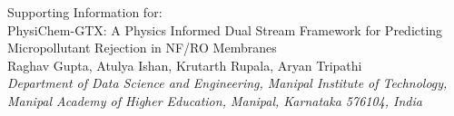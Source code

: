 \documentclass[11pt]{article}
\begin{document}
\begin{center}
    {\Large Supporting Information for:}\\[0.4cm]
    {\LARGE PhysiChem-GTX: A Physics Informed Dual Stream Framework for Predicting Micropollutant Rejection in NF/RO Membranes}\\[0.8cm]

    {\large Raghav Gupta, Atulya Ishan, Krutarth Rupala, Aryan Tripathi}\\[0.3cm]
    {\normalsize \textit{Department of Data Science and Engineering, Manipal Institute of Technology,}}\\
    {\normalsize \textit{Manipal Academy of Higher Education, Manipal, Karnataka 576104, India}}\\[0.6cm]
\end{center}

\vspace{0.6cm}
\end{document}
